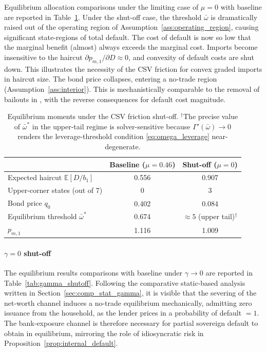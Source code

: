 \documentclass[11pt]{article}
\theoremstyle{definition}
\theoremstyle{plain}
\theoremstyle{remark}
\begin{document}
Equilibrium allocation comparisons under the limiting case of $\mu=0$ with baseline are reported in Table~\ref{tab:mu_shutoff}. Under the shut-off case, the threshold $\bar \omega$ is dramatically raised out of the operating region of Assumption~\ref{ass:operating_region}, causing significant state-regions of total default. The cost of default is now so low that the marginal benefit (almost) always exceeds the marginal cost. Imports become insensitive to the haircut $\partial p_{m,1}/\partial D\approx0$, and convexity of default costs are shut down. This illustrates the necessity of the CSV friction for convex graded imports in haircut size. The bond price collapses, entering a no-trade region (Assumption~\ref{ass:interior}). This is mechanistically comparable to the removal of bailouts in \citet{hur_optimal_2021}, with the reverse consequences for default cost magnitude.

\begin{table}[ht]
\centering
\begin{tabular}{lcc}
\toprule
& Baseline ($\mu = 0.46$) & Shut-off ($\mu = 0$) \\
\midrule
Expected haircut $\mathbb{E}[D/b_1]$       & 0.556 & 0.907 \\
Upper-corner states (out of 7)              & 0     & 3     \\
Bond price $q_0$                            & 0.402 & 0.084 \\
Equilibrium threshold $\bar\omega^*$        & 0.674 & $\approx 5$ (upper tail)$^\dagger$ \\
$p_{m,1}$  &   1.116    &   1.009 \\
\bottomrule
\end{tabular}
\caption{Equilibrium moments under the CSV friction shut-off. $^\dagger$The precise value of $\bar\omega^*$ in the upper-tail regime is solver-sensitive because $\Gamma'(\bar\omega) \to 0$ renders the leverage-threshold condition \eqref{eq:omega_leverage} near-degenerate.}
\label{tab:mu_shutoff}
\end{table}

\paragraph{$\gamma=0$ shut-off}

The equilibrium results comparisons with baseline under $\gamma\to 0$ are reported in Table~\ref{tab:gamma_shutoff}. Following the comparative static-based analysis written in Section~\ref{sec:comp_stat_gamma}, it is visible that the severing of the net-worth channel induces a no-trade equilibrium mechanically, admitting zero issuance from the household, as the lender prices in a probability of default $=1$. The bank-exposure channel is therefore necessary for partial sovereign default to obtain in equilibrium, mirroring the role of idiosyncratic risk in Proposition~\ref{prop:internal_default}.
\end{document}
